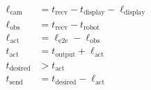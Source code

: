 \documentclass[border=7pt]{standalone}
\begin{document}
\color{ink}
$\displaystyle \begin{aligned}\ell_{\mathrm{cam}}&=t_{\mathrm{recv}}-t_{\mathrm{display}}-\ell_{\mathrm{display}}\\ \ell_{\mathrm{obs}}&=t_{\mathrm{recv}}-t_{\mathrm{robot}}\\ \ell_{\mathrm{act}}&=\ell_{\mathrm{e2e}}-\ell_{\mathrm{obs}}\\ t_{\mathrm{act}}&=t_{\mathrm{output}}+\ell_{\mathrm{act}}\\ t_{\mathrm{desired}}&>t_{\mathrm{act}}\\ t_{\mathrm{send}}&=t_{\mathrm{desired}}-\ell_{\mathrm{act}}\end{aligned}$
\end{document}
